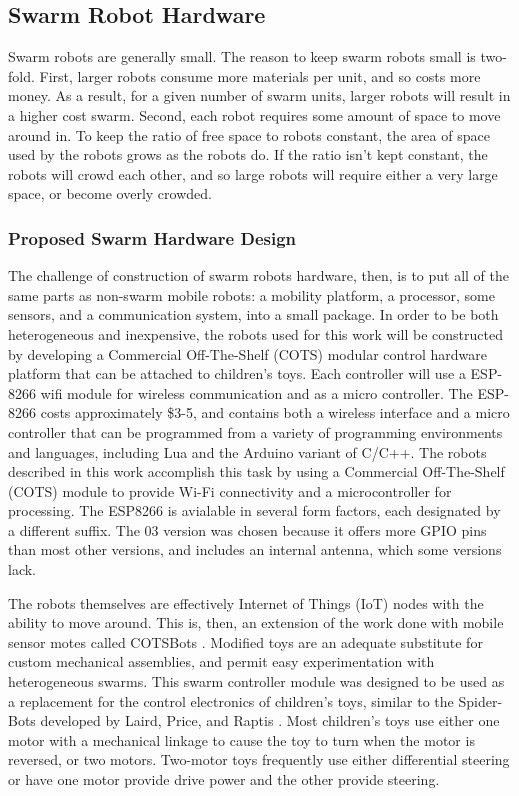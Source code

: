 \documentclass[]{article}
\begin{document}
\subsection{Swarm Robot Hardware}

Swarm robots are generally small. 
The reason to keep swarm robots small is two-fold. 
First, larger robots consume more materials per unit, and so costs more money.
As a result, for a given number of swarm units, larger robots will result in a higher cost swarm. 
Second, each robot requires some amount of space to move around in. 
To keep the ratio of free space to robots constant, the area of space used by the robots grows as the robots do. 
If the ratio isn't kept constant, the robots will crowd each other, and so large robots will require either a very large space, or become overly crowded.


\subsubsection{Proposed Swarm Hardware Design}

The challenge of construction of swarm robots hardware, then, is to put all of the same parts as non-swarm mobile robots: a mobility platform, a processor, some sensors, and a communication system, into a small package.
In order to be both heterogeneous and inexpensive, the robots used for this work will be constructed by developing a Commercial Off-The-Shelf (COTS) modular control hardware platform that can be attached to children's toys. 
Each controller will use a ESP-8266 wifi module for wireless communication and as a micro controller. 
The ESP-8266 costs approximately \$3-5, and contains both a wireless interface and a micro controller that can be programmed from a variety of programming environments and languages, including Lua and the Arduino variant of C/C++.   
The robots described in this work accomplish this task by using a Commercial Off-The-Shelf (COTS) module to provide Wi-Fi connectivity and a microcontroller for processing. 
The ESP8266 is avialable in several form factors, each designated by a different suffix. 
The 03 version was chosen because it offers more GPIO pins than most other versions, and includes an internal antenna, which some versions lack. 

The robots themselves are effectively Internet of Things (IoT) nodes with the ability to move around. 
This is, then, an extension of the work done with mobile sensor motes called COTSBots \cite{bergbreiter2003cotsbots}.
Modified toys are an adequate substitute for custom mechanical assemblies, and permit easy experimentation with heterogeneous swarms. 
This swarm controller module was designed to be used as a replacement for the control electronics of children's toys, similar to the Spider-Bots developed by Laird, Price, and Raptis \cite{lairdspider}. 
Most children's toys use either one motor with a mechanical linkage to cause the toy to turn when the motor is reversed, or two motors.
Two-motor toys frequently use either differential steering or have one motor provide drive power and the other provide steering. 
\end{document}
